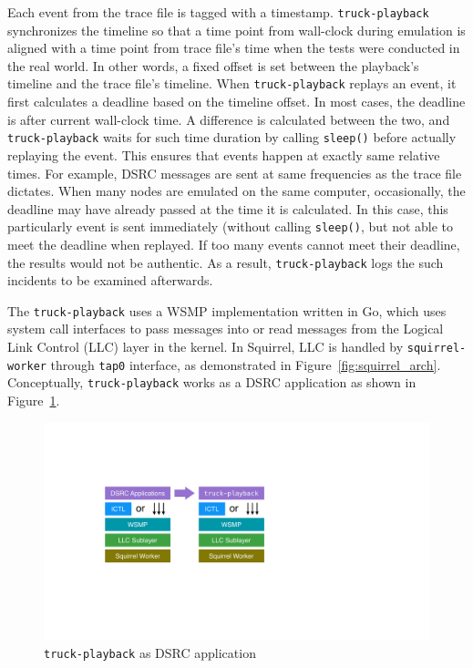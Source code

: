 \documentclass[12pt]{report}
\begin{document}
Each event from the trace file is tagged with a timestamp. \texttt{truck-playback} synchronizes the timeline so that a time point from wall-clock during emulation is aligned with a time point from trace file's time when the tests were conducted in the real world. In other words, a fixed offset is set between the playback's timeline and the trace file's timeline. When \texttt{truck-playback} replays an event, it first calculates a deadline based on the timeline offset. In most cases, the deadline is after current wall-clock time. A difference is calculated between the two, and \texttt{truck-playback} waits for such time duration by calling \texttt{sleep()} before actually replaying the event. This ensures that events happen at exactly same relative times. For example, DSRC messages are sent at same frequencies as the trace file dictates. When many nodes are emulated on the same computer, occasionally, the deadline may have already passed at the time it is calculated. In this case, this particularly event is sent immediately (without calling \texttt{sleep()}, but not able to meet the deadline when replayed. If too many events cannot meet their deadline, the results would not be authentic. As a result, \texttt{truck-playback} logs the such incidents to be examined afterwards.

The \texttt{truck-playback} uses a WSMP implementation written in Go, which uses system call interfaces to pass messages into or read messages from the Logical Link Control (LLC) layer in the kernel. In Squirrel, LLC is handled by \texttt{squirrel-worker} through \texttt{tap0} interface, as demonstrated in Figure~\ref{fig:squirrel_arch}. Conceptually, \texttt{truck-playback} works as a DSRC application as shown in Figure~\ref{fig:playback_arch}.

\begin{figure}[h]
  \begin{center}
    \includegraphics[width=.6\textwidth]{figures/playback_arch.pdf}
    \caption{\label{fig:playback_arch}\texttt{truck-playback} as DSRC application}
  \end{center}
\end{figure}
\end{document}
